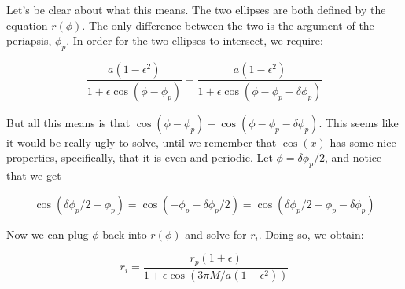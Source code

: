 \documentclass[11pt,largemargins]{homework}
\begin{document}
\begin{alphaparts}
Let's be clear about what this means. The two ellipses are both defined by the equation $r(\phi)$.  The only difference between the two is the argument of the periapsis, $\phi_{p}$.  In order for the two ellipses to intersect, we require:

\begin{equation}
\frac{a(1 - \epsilon^2)}{1 + \epsilon \cos(\phi - \phi_{p})} = \frac{a(1 - \epsilon^2)}{1+\epsilon \cos(\phi - \phi_{p} - \delta \phi_{p})}
\end{equation}

But all this means is that $\cos(\phi - \phi_{p}) - \cos(\phi - \phi_{p} - \delta \phi_{p})$. This seems like it would be really ugly to solve, until we remember that $\cos(x)$ has some nice properties, specifically, that it is even and periodic.  Let $\phi = \delta \phi_{p} / 2$, and notice that we get

$$
\cos{(\delta \phi_{p}/2 - \phi_{p})} = \cos(-\phi_{p} - \delta \phi_{p} / 2) = \cos(\delta \phi_{p} / 2 - \phi_{p} - \delta \phi_{p}) 
$$

Now we can plug $\phi$ back into $r(\phi)$ and solve for $r_{i}$.  Doing so, we obtain:

\begin{equation}
r_{i} = \frac{r_{p} (1 + \epsilon)}{1 + \epsilon \cos(3 \pi M/ a(1 - \epsilon^2))}
\end{equation}
\end{alphaparts}
\end{document}
